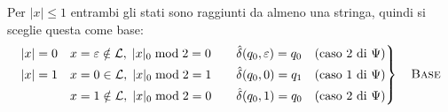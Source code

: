 \documentclass[a4paper, 11pt, oneside]{book}
\theoremstyle{formale}
\begin{document}
    Per $|x| \leq 1$ entrambi gli stati sono raggiunti da almeno una stringa, quindi si
    sceglie questa come base:
    \begin{equation*}
        \left.
        \begin{alignedat}{3}
            |x| = 0 \quad & x = \varepsilon \notin \mathcal{L},\; |x|_0 \bmod 2 = 0 &
                \qquad & \hat{\delta}(q_0, \varepsilon) = q_0
                &\quad \text{(caso 2 di $\Psi$)} \\
            |x| = 1 \quad & x = 0 \in \mathcal{L},\; |x|_0 \bmod 2 = 1 &
                & \hat{\delta}(q_0, 0) = q_1
                &\quad \text{(caso 1 di $\Psi$)} \\
            & x = 1 \notin \mathcal{L},\; |x|_0 \bmod 2 = 0 &
                & \hat{\delta}(q_0, 1) = q_0
                &\quad \text{(caso 2 di $\Psi$)}
        \end{alignedat}
        \right\}
        \quad \text{\textsc{Base}}
    \end{equation*}
\end{document}
